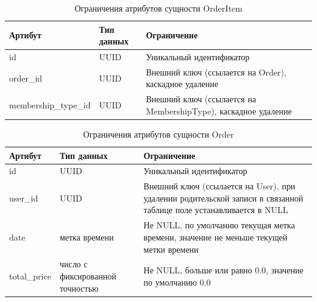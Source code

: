 \begin{table}[H]
	\centering
	\begin{tabular}{|p{4.5cm}|p{3.5cm}|p{7.5cm}|}
		\hline
		\textbf{Артибут}             & \textbf{Тип данных}   & \textbf{Ограничение}             \\ \hline
		id                            & UUID                 & Уникальный идентификатор         \\ \hline
		order\_id                     & UUID                  & Внешний ключ (ссылается на Order), каскадное удаление \\ \hline
		membership\_type\_id          & UUID                 & Внешний ключ (ссылается на MembershipType), каскадное удаление \\ \hline
	\end{tabular}
	\caption{Ограничения атрибутов сущности OrderItem}
\end{table}


\begin{table}[H]
	\centering
	\begin{tabular}{|p{2.5cm}|p{4.5cm}|p{8.5cm}|}
		\hline
		\textbf{Артибут}             & \textbf{Тип данных}   & \textbf{Ограничение}             \\ \hline
		id                            & UUID                  & Уникальный идентификатор         \\ \hline
		user\_id                      & UUID                 & Внешний ключ (ссылается на User), при удалении родительской записи в связанной таблице поле устанавливается в NULL \\ \hline
		date                          & метка времени             & Не NULL, по умолчанию текущая метка времени, значение не меньше текущей метки времени \\ \hline
		total\_price                  & число с фиксированной точностью               & Не NULL, больше или равно 0.0, значение по умолчанию 0.0     \\ \hline
	\end{tabular}
	\caption{Ограничения атрибутов сущности Order}
\end{table}

